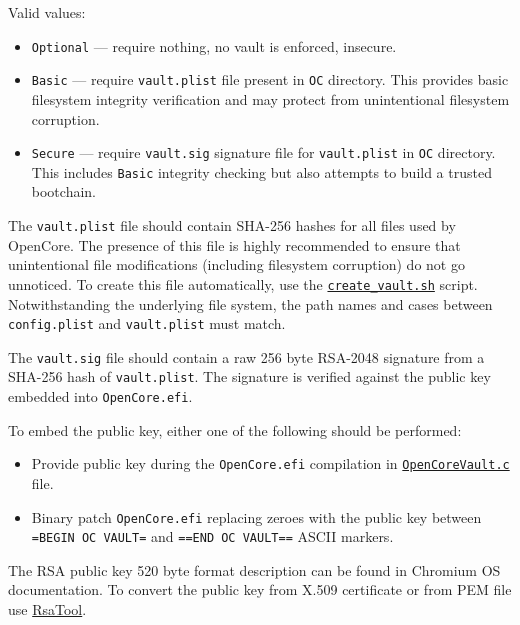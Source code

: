\documentclass[]{article}
\providecommand{\tightlist}{%
  \setlength{\itemsep}{0pt}\setlength{\parskip}{0pt}}
\begin{document}
\begin{enumerate}
  Valid values:

  \begin{itemize}
  \tightlist
  \item \texttt{Optional} --- require nothing, no vault is enforced, insecure.
  \item \texttt{Basic} --- require \texttt{vault.plist} file present
  in \texttt{OC} directory. This provides basic filesystem integrity
  verification and may protect from unintentional filesystem corruption.
  \item \texttt{Secure} --- require \texttt{vault.sig} signature file for
  \texttt{vault.plist} in \texttt{OC} directory. This includes \texttt{Basic}
  integrity checking but also attempts to build a trusted bootchain.
  \end{itemize}

  The \texttt{vault.plist} file should contain SHA-256 hashes for all files used by OpenCore.
  The presence of this file is highly recommended to ensure that unintentional file modifications
  (including filesystem corruption) do not go unnoticed. To create this file automatically, use the
  \href{https://github.com/acidanthera/OpenCorePkg/tree/master/Utilities/CreateVault}{\texttt{create\_vault.sh}}
  script. Notwithstanding the underlying file system, the path names and cases between \texttt{config.plist}
  and \texttt{vault.plist} must match.

  The \texttt{vault.sig} file should contain a raw 256 byte RSA-2048 signature from a SHA-256
  hash of \texttt{vault.plist}. The signature is verified against the public key embedded
  into \texttt{OpenCore.efi}.

  To embed the public key, either one of the following should be performed:

  \begin{itemize}
  \tightlist
  \item Provide public key during the \texttt{OpenCore.efi} compilation in
  \href{https://github.com/acidanthera/OpenCorePkg/blob/master/Platform/OpenCore/OpenCoreVault.c}{\texttt{OpenCoreVault.c}} file.
  \item Binary patch \texttt{OpenCore.efi} replacing zeroes with the public key
  between \texttt{=BEGIN OC VAULT=} and \texttt{==END OC VAULT==} ASCII markers.
  \end{itemize}

  The RSA public key 520 byte format description can be found in Chromium OS documentation.
  To convert the public key from X.509 certificate or from PEM file use
  \href{https://github.com/acidanthera/OpenCorePkg/tree/master/Utilities/CreateVault}{RsaTool}.



\end{enumerate}
\end{document}
